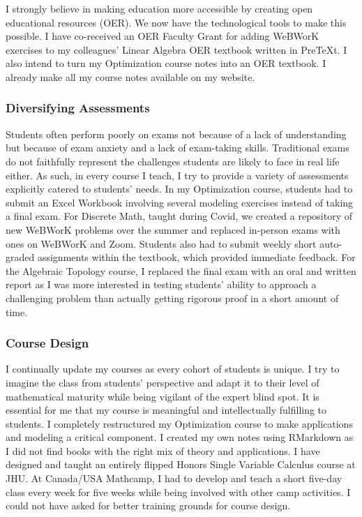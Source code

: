 \documentclass[
]{report}
\begin{document}
I strongly believe in making education more accessible by creating open educational resources (OER). We now have the technological tools to make this possible. I have co-received an OER Faculty Grant for adding WeBWorK exercises to my colleagues' Linear Algebra OER textbook written in PreTeXt. I also intend to turn my Optimization course notes into an OER textbook. I already make all my course notes available on my website.

\hypertarget{diversifying-assessments}{%
\subsubsection*{Diversifying Assessments}\label{diversifying-assessments}}


Students often perform poorly on exams not because of a lack of understanding but because of exam anxiety and a lack of exam-taking skills. Traditional exams do not faithfully represent the challenges students are likely to face in real life either. As such, in every course I teach, I try to provide a variety of assessments explicitly catered to students' needs. In my Optimization course, students had to submit an Excel Workbook involving several modeling exercises instead of taking a final exam. For Discrete Math, taught during Covid, we created a repository of new WeBWorK problems over the summer and replaced in-person exams with ones on WeBWorK and Zoom. Students also had to submit weekly short auto-graded assignments within the textbook, which provided immediate feedback. For the Algebraic Topology course, I replaced the final exam with an oral and written report as I was more interested in testing students' ability to approach a challenging problem than actually getting rigorous proof in a short amount of time.

\hypertarget{course-design}{%
\subsubsection*{Course Design}\label{course-design}}


I continually update my courses as every cohort of students is unique. I try to imagine the class from students' perspective and adapt it to their level of mathematical maturity while being vigilant of the expert blind spot. It is essential for me that my course is meaningful and intellectually fulfilling to students. I completely restructured my Optimization course to make applications and modeling a critical component. I created my own notes using RMarkdown as I did not find books with the right mix of theory and applications. I have designed and taught an entirely flipped Honors Single Variable Calculus course at JHU. At Canada/USA Mathcamp, I had to develop and teach a short five-day class every week for five weeks while being involved with other camp activities. I could not have asked for better training grounds for course design.
\end{document}
